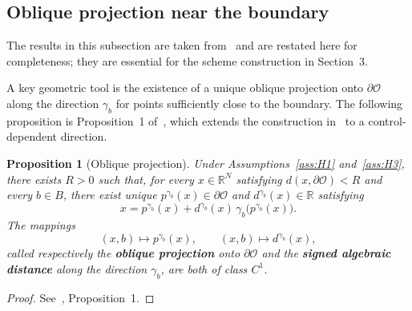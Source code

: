 \documentclass[11pt]{article}
\newtheorem{proposition}[theorem]{Proposition}
\theoremstyle{definition}
\theoremstyle{remark}
\newcommand{\R}{\mathbb{R}}
\newcommand{\cO}{\mathcal{O}}
\begin{document}
	\subsection{Oblique projection near the boundary}
	
	The results in this subsection are taken from~\cite{CalzolaEtAl2023} and are restated here for completeness; they are essential for the scheme construction in Section~3.
	
	A key geometric tool is the existence of a unique oblique projection onto $\partial\cO$ along the direction $\gamma_b$ for points sufficiently close to the boundary.  The following proposition is Proposition~1 of~\cite{CalzolaEtAl2023}, which extends the construction in~\cite[Section~1.2]{Gobet2001} to a control-dependent direction.
	
	\begin{proposition}[Oblique projection] \upshape\label{prop:oblique-proj}
		Under Assumptions~\ref{ass:H1} and~\ref{ass:H3}, there exists $R>0$ such that, for every $x\in\R^N$ satisfying $d(x,\partial\cO)<R$ and every $b\in B$, there exist unique $p^{\gamma_b}(x)\in\partial\cO$ and $d^{\gamma_b}(x)\in\R$ satisfying
		\begin{equation}
			x = p^{\gamma_b}(x) + d^{\gamma_b}(x)\,\gamma_b\!\big(p^{\gamma_b}(x)\big).
			\label{eq:oblique-decomp}
		\end{equation}
		The mappings
		\[
		(x,b)\longmapsto p^{\gamma_b}(x),\qquad (x,b)\longmapsto d^{\gamma_b}(x),
		\]
		called respectively the \textbf{oblique projection} onto $\partial\cO$ and the \textbf{signed algebraic distance} along the direction $\gamma_b$, are both of class $C^1$.
	\end{proposition}
	\begin{proof} \upshape See~\cite{CalzolaEtAl2023}, Proposition~1.\end{proof}
	
\end{document}
